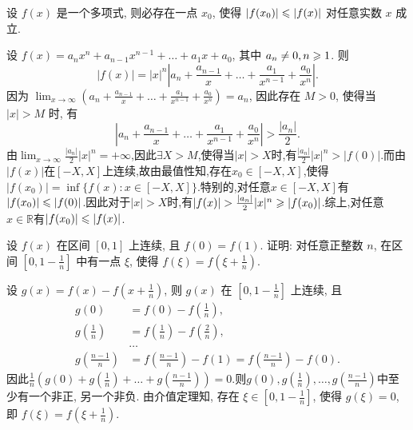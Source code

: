 \begin{exercise}[2.C.4]
    设 $f(x)$ 是一个多项式, 则必存在一点 $x_0$, 使得 $|f(x_0)| \leqslant |f(x)|$ 对任意实数 $x$ 成立.
\end{exercise}

\begin{solution}
    设 $f(x) = a_n x^n + a_{n-1} x^{n-1} + \dots + a_1 x + a_0$, 其中 $a_n \ne 0, n \geqslant 1$. 则
    $$ |f(x)| = |x|^n \left| a_n + \frac{a_{n-1}}{x} + \dots + \frac{a_1}{x^{n-1}} + \frac{a_0}{x^n} \right|. $$
    因为 $\lim_{x \to \infty} \left( a_n + \frac{a_{n-1}}{x} + \dots + \frac{a_1}{x^{n-1}} + \frac{a_0}{x^n} \right) = a_n$, 因此存在 $M > 0$, 使得当 $|x| > M$ 时, 有
    $$ \left| a_n + \frac{a_{n-1}}{x} + \dots + \frac{a_1}{x^{n-1}} + \frac{a_0}{x^n} \right| > \frac{|a_n|}{2}. $$
    由$\lim_{x \to \infty} \frac{|a_n|}{2} |x|^n = +\infty$,因此$\exists X > M$,使得当$|x| > X$时,有$\frac{|a_n|}{2} |x|^n > |f(0)|$.而由$|f(x)|$在$[-X,X]$上连续,故由最值性知,存在$x_0 \in [-X,X]$,使得$|f(x_0)| = \inf \{ f(x): x \in [-X,X] \}$.特别的,对任意$x \in [-X,X]$有$|f(x_0)| \leqslant |f(0)|$.因此对于$|x| > X$时,有$|f(x)| > \frac{|a_n|}{2}|x|^n \geqslant |f(x_0)|$.综上,对任意$x \in \mathbb{R}$有$|f(x_0)| \leqslant |f(x)|$.
\end{solution}

\begin{exercise}[2.C.5]
    设 $f(x)$ 在区间 $[0,1]$ 上连续, 且 $f(0)=f(1)$. 证明: 对任意正整数 $n$, 在区间 $\left[0, 1-\frac{1}{n}\right]$ 中有一点 $\xi$, 使得 $f(\xi) = f\left(\xi+\frac{1}{n}\right)$.
\end{exercise}

\begin{solution}
    设 $g(x) = f(x) - f\left(x+\frac{1}{n}\right)$, 则 $g(x)$ 在 $\left[0, 1-\frac{1}{n}\right]$ 上连续, 且
    \begin{align*}
        g(0) & = f(0) - f\left(\frac{1}{n}\right), \\
        g\left(\frac{1}{n}\right) & = f\left(\frac{1}{n}\right) - f\left(\frac{2}{n}\right), \\
        & \dots \\
        g\left(\frac{n-1}{n}\right) & = f\left(\frac{n-1}{n}\right) - f(1) = f\left(\frac{n-1}{n}\right) - f(0).
    \end{align*}
    因此$\frac{1}{n} \left( g(0) + g\left(\frac{1}{n}\right) + \dots + g\left(\frac{n-1}{n}\right) \right) = 0$.则$g(0), g\left(\frac{1}{n}\right), \dots, g\left(\frac{n-1}{n}\right)$中至少有一个非正, 另一个非负. 由介值定理知, 存在 $\xi \in \left[0, 1-\frac{1}{n}\right]$, 使得 $g(\xi) = 0$, 即 $f(\xi) = f\left(\xi+\frac{1}{n}\right)$.
\end{solution}

